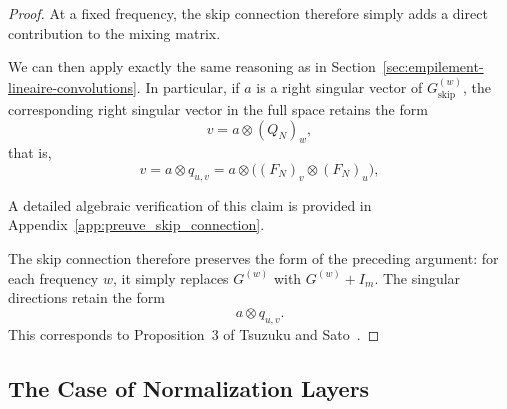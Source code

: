 \begin{proof}
At a fixed frequency, the skip connection therefore simply adds a direct contribution to the mixing
matrix.

We can then apply exactly the same reasoning as in Section~\ref{sec:empilement-lineaire-convolutions}.
In particular, if $a$ is a right singular vector of $G_{\mathrm{skip}}^{(w)}$, the corresponding right singular vector
in the full space retains the form
\[
v = a \otimes (Q_N)_w,
\]
that is,
\[
v
=
a \otimes q_{u,v}
=
a \otimes \bigl((F_N)_v \otimes (F_N)_u\bigr),
\]

A detailed algebraic verification of this claim is provided in Appendix~\ref{app:preuve_skip_connection}.

The skip connection therefore preserves the form of the preceding argument: for each frequency $w$,
it simply replaces $G^{(w)}$ with $G^{(w)}+I_m$. The singular directions retain the form
\[
    a\otimes q_{u,v}.
\]
This corresponds to Proposition~3 of Tsuzuku and Sato~\cite{tsuzuku2019structural}.

\end{proof}

\subsection{The Case of Normalization Layers}

